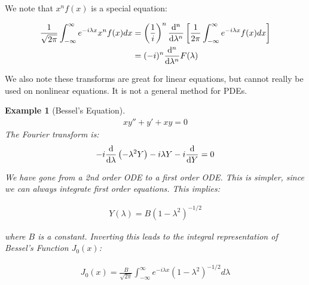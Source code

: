 \documentclass{article}
\newtheorem{ex}{Example}
\theoremstyle{definition}
\begin{document}
We note that $x^n f(x)$ is a special equation:

\begin{align*}
\frac{1}{\sqrt{2 \pi}} \int_{-\infty}^{\infty} e^{- i \lambda x} x^n f(x) dx &= 
\left(\frac{1}{i}\right)^n \dv{^n}{\lambda^n} \left[\frac{1}{2\pi} \int_{-\infty}^{\infty} e^{- i \lambda x} f(x) dx\right] \\ 
& = (-i)^n \dv{^n}{\lambda^n} F(\lambda)
\end{align*}

We also note these transforms are great for linear equations, but cannot really be used on nonlinear equations. It is not a general method for PDEs.

\begin{ex}[Bessel's Equation]
\begin{align*}
xy'' + y' + xy = 0
\end{align*}
The Fourier transform is:
\begin{align*}
-i \dv{\lambda} \left(- \lambda^2 Y\right) - i \lambda Y - i \dv{Y} = 0
\end{align*}

We have gone from a 2nd order ODE to a first order ODE. This is simpler, since we can always integrate first order equations. This implies:

\begin{align*}
Y(\lambda) = B(1-\lambda^2)^{-1/2}
\end{align*}

where $B$ is a constant. Inverting this leads to the integral representation of Bessel's Function $J_0(x)$:

\begin{align*}
J_0(x) = \frac{B}{\sqrt{2\pi}} \int_{-\infty}^{\infty} e^{- i \lambda x}(1-\lambda^2)^{-1/2} d\lambda 
\end{align*}
\end{ex}
\end{document}
